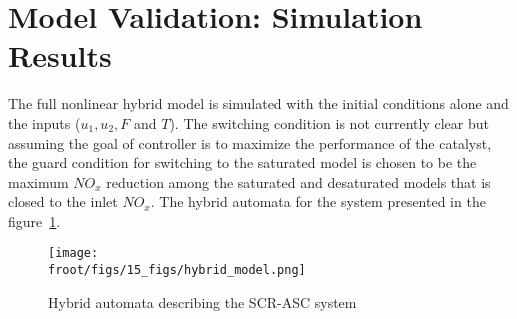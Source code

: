\newpage
\section{Model Validation: Simulation Results}

The full nonlinear hybrid model is simulated with the initial conditions alone and the inputs ($u_1, u_2, F$ and $T$). The switching condition is not currently clear but assuming the goal of controller is to maximize the performance of the catalyst, the guard condition for switching to the saturated model is chosen to be the maximum $NO_x$ reduction among the saturated and desaturated models that is closed to the inlet $NO_x$. The hybrid automata for the system presented in the figure~\ref{fig::hybrid_automata}.

\begin{figure}[H]
        \centering
        \texttt{[image: \\froot/figs/15\_figs/hybrid\_model.png]}
        \caption{Hybrid automata describing the SCR-ASC system}
        \label{fig::hybrid_automata}
\end{figure}

